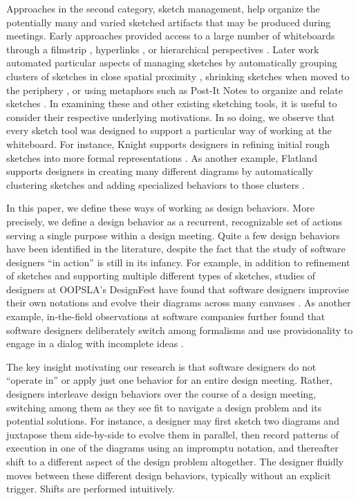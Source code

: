 Approaches in the second category, sketch management, help organize the potentially many and varied sketched artifacts that may be produced during meetings. Early approaches provided access to a large number of whiteboards through a filmstrip \cite{stefik1987beyond}, hyperlinks \cite{Streitz:1994:DIM:192844.193044}, or hierarchical perspectives \cite{newman2003denim}. Later work automated particular aspects of managing sketches by automatically grouping clusters of sketches in close spatial proximity \cite{mynatt1999flatland}, shrinking sketches when moved to the periphery \cite{guimbretiere2001fluid}, or using metaphors such as Post-It Notes to organize and relate sketches \cite{klemmer2001designers}.  
In examining these and other existing sketching tools, it is useful to consider their respective underlying motivations. In so doing, we observe that every sketch tool was designed to support a particular way of working at the whiteboard. For instance, Knight supports designers in refining initial rough sketches into more formal representations \cite{damm2000supporting}. As another example, Flatland supports designers in creating many different diagrams by automatically clustering sketches and adding specialized behaviors to those clusters \cite{mynatt1999flatland}.

In this paper, we define these ways of working as design behaviors. More precisely, we define a design behavior as a recurrent, recognizable set of actions serving a single purpose within a design meeting. Quite a few design behaviors have been identified in the literature, despite the fact that the study of software designers “in action” is still in its infancy. For example, in addition to refinement of sketches and supporting multiple different types of sketches, studies of designers at OOPSLA’s DesignFest have found that software designers improvise their own notations and evolve their diagrams across many canvases \cite{dekel2007notation}. As another example, in-the-field observations at software companies further found that software designers deliberately switch among formalisms and use provisionality to engage in a dialog with incomplete ideas \cite{petre2009insights}. 

The key insight motivating our research is that software designers do not “operate in” or apply just one behavior for an entire design meeting. Rather, designers interleave design behaviors over the course of a design meeting, switching among them as they see fit to navigate a design problem and its potential solutions. For instance, a designer may first sketch two diagrams and juxtapose them side-by-side to evolve them in parallel, then record patterns of execution in one of the diagrams using an impromptu notation, and thereafter shift to a different aspect of the design problem altogether. The designer fluidly moves between these different design behaviors, typically without an explicit trigger. Shifts are performed intuitively.

